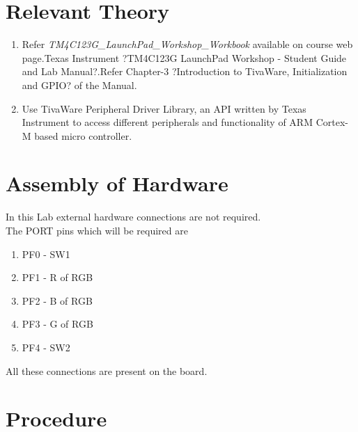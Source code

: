 \documentclass[a4paper,12pt,oneside]{book}
\begin{document}
\section {Relevant Theory}
\begin{enumerate}
\item Refer \textit {TM4C123G\_LaunchPad\_Workshop\_Workbook} available on course web page.Texas Instrument ?TM4C123G
LaunchPad Workshop - Student Guide and Lab Manual?.Refer Chapter-3
?Introduction to TivaWare, Initialization and GPIO? of the Manual.
\item Use TivaWare Peripheral Driver Library, an API written by Texas Instrument to
access different peripherals and functionality of ARM Cortex-M based micro controller. 
\end{enumerate}

\section{Assembly of Hardware}
In this Lab external hardware connections are not required.\\
The PORT pins which will be required are 
\begin{enumerate}
\item PF0 - SW1
\item PF1 - R of RGB
\item PF2 - B of RGB
\item PF3 - G of RGB
\item PF4 - SW2
\end{enumerate}
All these connections are present on the board.
\section {Procedure}

\end{document}
